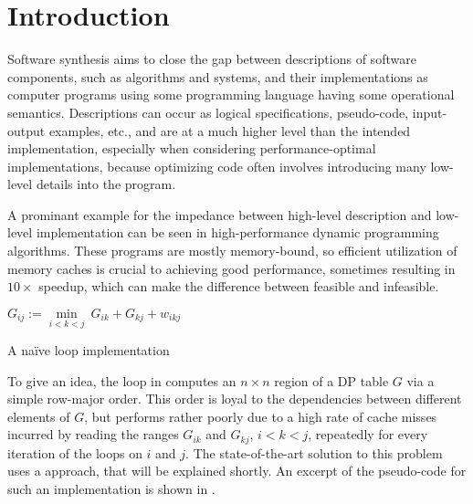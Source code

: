 \section{Introduction}
\label{intro}

Software synthesis aims to close the gap between descriptions of software
components, such as algorithms and systems, and their implementations
as computer programs using some programming language having some operational
semantics. Descriptions can occur as logical specifications, pseudo-code,
input-output examples, etc., and are at a much higher level than the
intended implementation, especially when considering performance-optimal
implementations, because optimizing code often involves introducing many
low-level details into the program.

A prominant example for the impedance between high-level description and
low-level implementation can be seen in high-performance dynamic programming algorithms.
These programs are mostly memory-bound, so efficient utilization of memory
caches is crucial to achieving good performance, sometimes resulting in $10\times$
speedup, which can make the difference between feasible and infeasible.

\begin{algorithm}[t]
\begin{algorithmic}
      \State $G_{ij} := \underset{i<k<j}\min ~ G_{ik} + G_{kj} + w_{ikj}$
    \EndFor
  \EndFor
\end{algorithmic}
\caption{\label{intro:naive}
   A na\"ive loop implementation}
\end{algorithm}


To give an idea, the loop in  computes an $n\times n$
region of a DP table $G$ via a simple row-major order. This order is
loyal to the dependencies between different elements of $G$, but
performs rather poorly due to a high rate of cache misses incurred by
reading the ranges $G_{ik}$ and $G_{kj}$, $i<k<j$, repeatedly for every
iteration of the loops on $i$ and $j$.
The state-of-the-art solution to this problem uses a 
approach, that will be explained shortly. An excerpt of the pseudo-code for such
an implementation is shown in .

